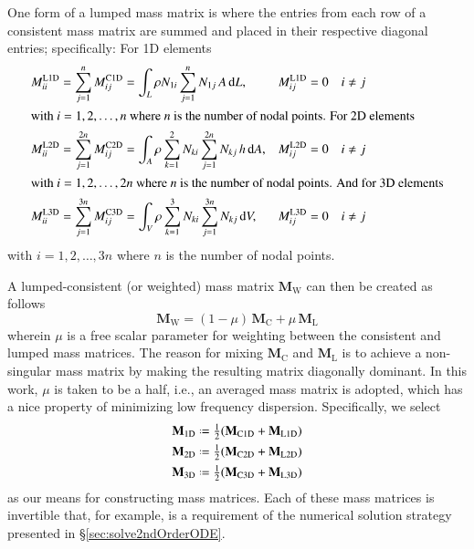 One form of a lumped mass matrix is where the entries from each row of a consistent mass matrix are summed and placed in their respective diagonal entries; specifically: \cite{Reddy93} For 1D elements
\begin{subequations}
    \label{lumpedMassMatrix}
    \begin{align}
    M^{\mathrm{L1D}}_{ii} & = \sum_{j=1}^n M^{\mathrm{C1D}}_{ij} = \int_L \rho N_{1i} \sum_{j=1}^n N_{1j} \, A \, \mathrm{d}L , & 
    M^{\mathrm{L1D}}_{ij} & = 0 \quad i \neq j  
    \label{lumpedMassMatrix1D} \\
    \intertext{with $i = 1, 2, \ldots , n$ where $n$ is the number of nodal points. For 2D elements}
    M^{\mathrm{L2D}}_{ii} & = \sum_{j=1}^{2n} M^{\mathrm{C2D}}_{ij} = \int_A \rho \sum_{k=1}^2 N_{ki} \sum_{j=1}^{2n} N_{kj} \, h \, \mathrm{d} A , & 
    M^{\mathrm{L2D}}_{ij} & = 0 \quad i \neq j  
    \label{lumpedMassMatrix2D} \\
    \intertext{with $i = 1 , 2, \ldots , 2n$ where $n$ is the number of nodal points. And for 3D elements}
    M^{\mathrm{L3D}}_{ii} & = \sum_{j=1}^{3n} M^{\mathrm{C3D}}_{ij} = \int_V \rho \sum_{k=1}^3 N_{ki} \sum_{j=1}^{3n} N_{kj} \, \mathrm{d} V , & 
    M^{\mathrm{L3D}}_{ij} & = 0 \quad i \neq j  
    \label{lumpedMassMatrix3D}
    \end{align}
\end{subequations}
with $i = 1, 2, \ldots , 3n$ where $n$ is the number of nodal points. 

A lumped-consistent (or weighted) mass matrix $\mathbf{M}_{\mathrm{W}}$ can then be created as follows
\begin{equation*}
\mathbf{M}_\mathrm{W}  = (1 - \mu) \, \mathbf{M}_{\mathrm{C}} + \mu \, \mathbf{M}_{\mathrm{L}}
\end{equation*}
wherein $\mu$ is a free scalar parameter for weighting between the consistent and lumped mass matrices.  The reason for mixing $\mathbf{M}_{\mathrm{C}}$ and $\mathbf{M}_{\mathrm{L}}$ is to achieve a non-singular mass matrix by making the resulting matrix diagonally dominant.  In this work, $\mu$ is taken to be a half, i.e., an averaged mass matrix is adopted, which has a nice property of minimizing low frequency dispersion.  Specifically, we select
\begin{subequations}
    \label{LumconsMass}
    \begin{align}
    \mathbf{M}_{\mathrm{1D}} & \defeq \tfrac{1}{2} (\mathbf{M}_{\mathrm{C1D}} + \mathbf{M}_{\mathrm{L1D}}) \\
    \mathbf{M}_{\mathrm{2D}} & \defeq \tfrac{1}{2} (\mathbf{M}_{\mathrm{C2D}} + \mathbf{M}_{\mathrm{L2D}}) \\
    \mathbf{M}_{\mathrm{3D}} & \defeq \tfrac{1}{2} (\mathbf{M}_{\mathrm{C3D}} + \mathbf{M}_{\mathrm{L3D}})
    \end{align}
\end{subequations}
as our means for constructing mass matrices.  Each of these mass matrices is invertible that, for example, is a requirement of the numerical solution strategy presented in \S\ref{sec:solve2ndOrderODE}.

